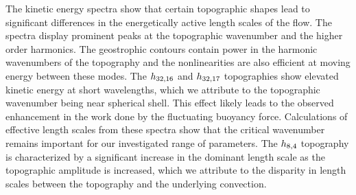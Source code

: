 
The kinetic energy spectra show that certain topographic shapes lead to significant differences in the energetically active length scales of the flow. 
The spectra display prominent peaks at the topographic wavenumber and the higher order harmonics. 
The geostrophic contours contain power in the harmonic wavenumbers of the topography and the nonlinearities are also efficient at moving energy between these modes.
The $h_{32,16}$ and $h_{32,17}$ topographies show elevated kinetic energy at short wavelengths, which we attribute to the topographic wavenumber being near  spherical shell. 
This effect likely leads to the observed enhancement in the work done by the fluctuating buoyancy force. 
Calculations of effective length scales from these spectra show that the critical wavenumber remains important for our investigated range of parameters. 
The $h_{8,4}$ topography is characterized by a significant increase in the dominant length scale as the topographic amplitude is increased, which we attribute to the disparity in length scales between the topography and the underlying convection.



